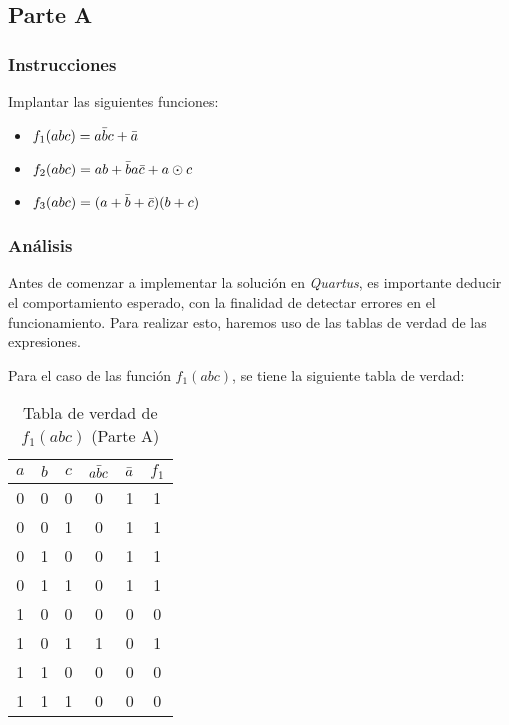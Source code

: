 \documentclass[../procedimientos.tex]{subfiles}
\begin{document}
\clearpage
\subsection{Parte A}
\subsubsection{Instrucciones}
Implantar las siguientes funciones:
\begin{itemize}
  \item $f_1 (abc) = a\bar{b}c + \bar{a}$
  \item $f_2 (abc) = ab + \bar{b}a\bar{c} + a \odot c$
  \item $f_3 (abc) = (a + \bar{b} + \bar{c}) (b + c)$
\end{itemize}

\subsubsection{Análisis}\label{subs:analisis_a}
Antes de comenzar a implementar la solución en \textit{Quartus}, es importante 
deducir el comportamiento esperado, con la finalidad de detectar errores en el 
funcionamiento. Para realizar esto, haremos uso de las tablas de verdad de las 
expresiones.

Para el caso de las función $f_1(abc)$, se tiene la siguiente tabla de verdad:
\begin{table}[H]
  \centering
  \begin{tabular}{ccc|cc|c}
    \hline
    $a$ & $b$ & $c$ & $a\bar{b}c$ & $\bar{a}$ & $f_1$\\
    \hline
    0 & 0 & 0 & 0 & 1 & 1\\
    0 & 0 & 1 & 0 & 1 & 1\\
    0 & 1 & 0 & 0 & 1 & 1\\
    0 & 1 & 1 & 0 & 1 & 1\\
    1 & 0 & 0 & 0 & 0 & 0\\
    1 & 0 & 1 & 1 & 0 & 1\\
    1 & 1 & 0 & 0 & 0 & 0\\
    1 & 1 & 1 & 0 & 0 & 0\\
    \hline
  \end{tabular}
  \caption{Tabla de verdad de $f_1(abc)$ (Parte A)}
  \label{tab:a_f1}
\end{table}
\end{document}
